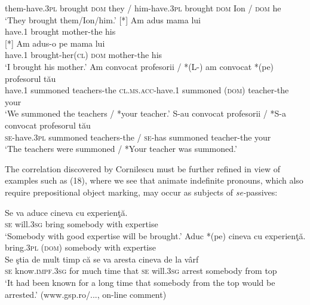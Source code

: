 \documentclass[output=paper]{langsci/langscibook}
\begin{document}
\begin{xlista}[c{'}{'}.]
         them-have.3\textsc{pl} brought \textsc{dom} they /  him-have.3\textsc{pl} brought \textsc{dom} Ion /  \textsc{dom} he\\
    \glt ‘They brought them/Ion/him.’ 
    [*]{
    \gll Am      adus     mama         lui \\
         have.1 brought mother-the his\\
    }
    [*]{
     \gll Am      adus-o               pe    mama         lui \\
           have.1 brought-her(\textsc{cl}) \textsc{dom} mother-the his \\
     \glt       ‘I brought his mother.’
    }
    \ex
    \gll Am     convocat     profesorii  / *(L-)             am      convocat  *(pe)     profesorul  tău\\
         have.1 summoned teachers-the   \textsc{cl.ms.acc-}have.1 summoned \textsc{(dom)} teacher-the your\\
    \glt ‘We summoned the teachers / *your teacher.’
    \gll S-au            convocat   profesorii     / *S-a convocat        profesorul   tău \\
         \textsc{se-}have.3\textsc{pl} summoned teachers-the / \textsc{se-}has summoned teacher-the your \\
    \glt ‘The teachers were summoned / *Your teacher was summoned.’ 
    \end{xlista}
\z

The correlation discovered by Cornilescu must be further refined in view of examples such as (18), where we see that animate indefinite pronouns, which also require prepositional object marking, may occur as subjects of \textit{se-}passives:

\ea%
    \label{ex:giurgea:18}
    \ea
    \gll  Se va           aduce  cineva       cu    experienţă.\\
         \textsc{se} will.3\textsc{sg}  bring   somebody with expertise\\
    \glt ‘Somebody with good expertise will be brought.’
    \ex
    \gll Aduc      *(pe)   cineva        cu    experienţă.\\
         bring.3\textsc{pl} (\textsc{dom}) somebody with expertise\\
    \ex
    \gll Se ştia                  de  mult  timp  că   se  va          aresta cineva       de la vârf\\
         \textsc{se} know.\textsc{impf.3sg} for much time that \textsc{se} will.3\textsc{sg} arrest somebody from top\\
    \glt ‘It had been known for a long time that somebody from the top would be arrested.’ (www.gsp.ro/..., on-line comment)
    \z
\z    
\end{document}

